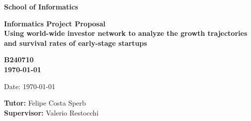\documentclass[a4paper,11pt]{article}
\newcommand{\examnumber}{B240710}
\newcommand{\field}{Using world-wide investor network to analyze the growth trajectories and survival rates of early-stage startups}
\newcommand{\tutor}{Felipe Costa Sperb}
\newcommand{\supervisor}{Valerio Restocchi}
\begin{document}
\begin{minipage}[b]{110mm}
        {\Huge\bf School of Informatics
        \vspace*{17mm}}
\end{minipage}
\hfill
\begin{minipage}[t]{40mm}               
\end{minipage}
\par\noindent
\vspace*{2cm}
\begin{center}
        \Large\bf Informatics Project Proposal \\
        \Large\bf \field
\end{center}
\vspace*{1.5cm}
\begin{center}
        \bf \examnumber\\
        \monthyeardate\today
\end{center}
\vspace*{5mm}

%
%                       
\begin{abstract}
This research investigates how investor network characteristics and connectivity influence startup growth trajectories and survival rates. Utilizing network science, we construct a comprehensive model of investor-startup relationships and analyzing its centrality measurement, community detection, and their evolution over time. Our methodology integrates quantitative investment data interactions across temporal networks. Preliminary findings suggest that investor centrality and the structure of investment communities significantly affect startup outcomes. This study provides insights into effective investment strategies and supports startups in navigating the investment landscape, ultimately enhancing their likelihood of success.
\end{abstract}

\vspace*{1cm}

\vspace*{3cm}
Date: \today

\vfill
{\bf Tutor:} \tutor\\
{\bf Supervisor:} \supervisor
\newpage

\setcounter{page}{1}                            %
\footruleheight{1pt}
\headruleheight{1pt}
\rhead{- \thepage}
\cfoot{}
%
\end{document}
